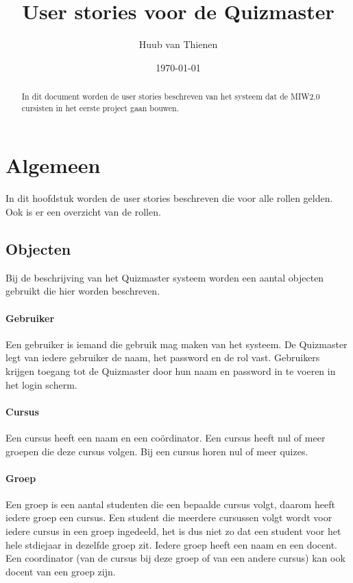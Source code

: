 \documentclass[11pt, a4paper]{article}
\begin{document}
\title{User stories voor de Quizmaster}
\date{\today}
\author{Huub van Thienen}
\maketitle
\begin{abstract}
In dit document worden de user stories beschreven van het systeem dat de MIW2.0 cursisten in het eerste project gaan bouwen.
\end{abstract}

\section{Algemeen}

In dit hoofdstuk worden de user stories beschreven die voor alle rollen gelden. Ook is er een overzicht van de rollen.

\subsection{Objecten}
Bij de beschrijving van het Quizmaster systeem worden een aantal objecten gebruikt die hier worden beschreven.

\paragraph{Gebruiker} Een gebruiker is iemand die gebruik mag maken van het systeem. 
De Quizmaster legt van iedere gebruiker de naam, het password en de rol vast. 
Gebruikers krijgen toegang tot de Quizmaster door hun naam en password in te voeren in het login scherm.

\paragraph{Cursus} Een cursus heeft een naam en een co\"ordinator.
Een cursus heeft nul of meer groepen die deze cursus volgen.
Bij een cursus horen nul of meer quizes.

\paragraph{Groep} Een groep is een aantal studenten die een bepaalde cursus volgt, daarom heeft iedere groep een cursus.
Een student die meerdere cursussen volgt wordt voor iedere cursus in een groep ingedeeld, het is dus niet zo dat een student voor het hele stdiejaar in dezelfde groep zit.
Iedere groep heeft een naam en een docent.
Een coordinator (van de cursus bij deze groep of van een andere cursus) kan ook docent van een groep zijn.
\end{document}
